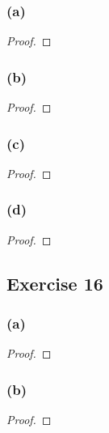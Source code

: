 \documentclass[14pt]{extarticle}
\begin{document}
\subsubsection{(a)}

\begin{proof}

\end{proof}

\subsubsection{(b)}

\begin{proof}

\end{proof}

\subsubsection{(c)}

\begin{proof}

\end{proof}

\subsubsection{(d)}

\begin{proof}

\end{proof}

\subsection{Exercise 16}

\subsubsection{(a)}

\begin{proof}

\end{proof}

\subsubsection{(b)}

\begin{proof}

\end{proof}
\end{document}
